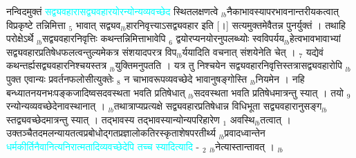 \documentclass[article,12pt,a4paper]{memoir}%
\newcommand{\quotelemma}[1]{\textcolor{cyan}{#1}}
\newcounter{parCount}
\begin{document}
	  
	  \pstart \leavevmode%
	\hphantom{.}नन्विदमुक्तं \quotelemma{सद्व्यवहारासद्व्यवहारयोरन्योन्यव्यवच्छेद} स्थितलक्षणत्वे {\tiny $_{lb}$}नैकाभावस्यापरभावनान्तरीयकत्वात् विप्रकृष्टे तन्निमित्ता {\tiny $_{5}$} भावात् सद्व्यव{\tiny $_{lb}$}हारनिवृत्त्याऽसद्व्यवहार इति [।] सत्यमुक्तमेवैतन्न पुनर्युक्तं । तथाहि परोक्षेऽर्थे {\tiny $_{lb}$}सद्व्यवहारनिवृत्तिः कथन्तन्निमित्ताभावेपि {\tiny $_{6}$} द्वयोरप्यनयोरनुपलब्ध्योः स्वविपर्यय{\tiny $_{lb}$}हेत्वभावभावाभ्यां सद्व्यवहारप्रतिषेधफलत्वन्तुल्यमेकत्र संशयादपरत्र विप{\tiny $_{lb}$}र्ययादिति वचनात् संशयेनेति चेत् । {\tiny $_{7}$} यद्येवं कथन्तर्ह्यसद्व्यवहारनिश्चयस्तत्र {\tiny $_{lb}$}युक्तिमनुपतति । यत्र तु निश्चयेन सद्व्यवहारनिवृत्तिस्तत्रासद्व्यवहारोपि {\tiny $_{lb}$}पुक्त एवान्यः प्रवर्तनफलोसीत्युक्तेः {\tiny $_{8}$} न चाभावरूपव्यवच्छेदे भावानुषङ्गोस्ति {\tiny $_{lb}$}नियमेन । नहि बन्ध्यातनयनभःपङ्कजादिष्वसदवस्थता भवति प्रतिषेधात् {\tiny $_{lb}$}सदवस्थता भवति प्रतिषेधमात्रन्तु स्यात् । तयो {\tiny $_{9}$}\leavevmode{} रन्योन्यव्यवच्छेदेनावस्थानात् । {\tiny $_{lb}$}तथात्राप्यप्रत्यक्षे सद्व्यवहारप्रतिषेधान्न विधिभूता सद्व्यवहारानुसङ्ग{\tiny $_{lb}$}स्तद्व्यवच्छेदमात्रन्तु स्यात् । तद्भावस्य तद्भावस्यान्योन्यपरिहारेण {\tiny $_{1}$} अवस्थि{\tiny $_{lb}$}तत्वात् । उक्तञ्चैतदमलन्यायतत्वप्रबोधोद्गतप्रज्ञालोकतिरस्कृताशेषपरतीर्थ्य {\tiny $_{lb}$}प्रवादध्वान्तेन \quotelemma{धर्मकीर्तिनैवानित्यनिरात्मतादिव्यवच्छेदेपि तच्च स्यादित्यादि} - {\tiny $_{2}$} {\tiny $_{lb}$}नेत्यास्तान्तावत् ।
	{}
	\pend%
      {\tiny $_{lb}$}
\end{document}
